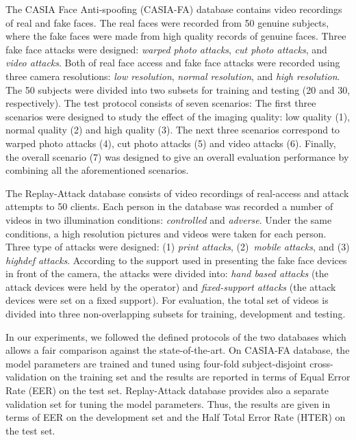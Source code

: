 \documentclass{article}
\begin{document}
The CASIA Face Anti-spoofing (CASIA-FA) database \cite{casia} contains video recordings of real and fake faces. The real faces were recorded from 50 genuine subjects, where the fake faces were made from high quality records of genuine faces. Three fake face attacks were designed: \textit{warped photo attacks}, \textit{cut photo attacks}, and \textit{video attacks}. Both of real face access and fake face attacks were recorded using three camera resolutions: \textit{low resolution}, \textit{normal resolution}, and \textit{high resolution}. The 50 subjects were divided into two subsets for training and testing (20 and 30, respectively). The test protocol consists of seven scenarios: The first three scenarios were designed to study the effect of the imaging quality: low  quality (1), normal quality (2) and high quality (3). The next three scenarios correspond to warped photo attacks (4), cut photo attacks (5) and video attacks (6). Finally, the overall scenario (7) was designed to give an overall evaluation performance by combining all the aforementioned scenarios.

The Replay-Attack database \cite{replay} consists of video recordings of  real-access and attack attempts to 50 clients. Each person in the database was recorded a number of videos in two illumination conditions: \textit{controlled} and \textit{adverse}. Under the same conditions, a high resolution pictures and videos were taken for each person. Three type of attacks were designed: (1) \textit{print attacks}, (2)~\textit{mobile attacks}, and (3) \textit{highdef attacks}. According to the support used in presenting the fake face devices in front of the camera, the attacks were divided into: \textit{hand based attacks} (the attack devices were held by the operator) and \textit{fixed-support attacks} (the attack devices were set on a fixed support). For evaluation, the total set of videos is divided into three non-overlapping subsets for training, development and testing.  

In our experiments, we followed the defined protocols of the two databases which allows a fair comparison against the state-of-the-art. On CASIA-FA database, the model parameters are trained and tuned using four-fold subject-disjoint cross-validation on the training set and the results are reported in terms of Equal Error Rate (EER) on the test set. Replay-Attack database provides also a separate validation set for tuning the model parameters. Thus, the results are given in terms of EER on the development set and the Half Total Error Rate (HTER) on the test set.
\end{document}
